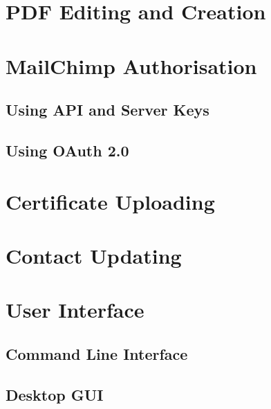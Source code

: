 \documentclass[11pt]{article}
\begin{document}
\newpage

\section{PDF Editing and Creation}



\newpage

\section{MailChimp Authorisation}

\subsection{Using API and Server Keys}




\subsection{Using OAuth 2.0}



\newpage

\section{Certificate Uploading}




\newpage

\section{Contact Updating}



\newpage

\section{User Interface}

\subsection{Command Line Interface}






\subsection{Desktop GUI}
\end{document}
